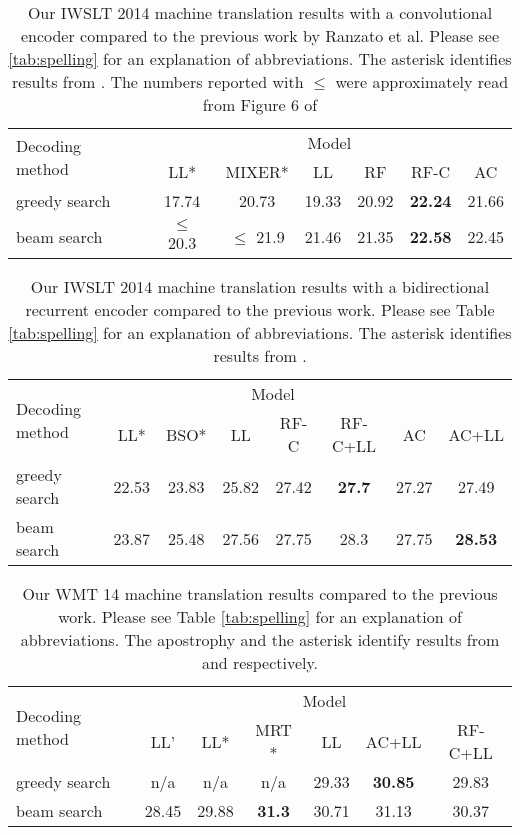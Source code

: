 \documentclass{article} \usepackage{iclr2017_conference,times}
\begin{document}
\begin{table}\centering
    \caption{Our IWSLT 2014 machine translation results with a convolutional encoder compared to the previous work by Ranzato et al.
    Please see \ref{tab:spelling} for an explanation of abbreviations. The asterisk
    identifies results from \citep{ranzato2015sequence}. 
    The numbers reported with $\leq$ were approximately read from
    Figure 6 of \citep{ranzato2015sequence} }
    \begin{tabular}{l | c | c | c | c | c | c}
        \multirow{2}{*}{Decoding method} & \multicolumn{6}{|c}{Model} \\
                                         & LL* & MIXER* & LL & RF & RF-C & AC \\
        \hline\hline
        greedy search & 17.74       & 20.73       & 19.33 & 20.92 & \textbf{22.24} & 21.66 \\
        beam search   & $\leq$ 20.3 & $\leq$ 21.9 & 21.46 & 21.35 & \textbf{22.58} & 22.45 
    \end{tabular}
    \label{tab:mt}
\end{table}

\begin{table}\centering
    \caption{
        Our IWSLT 2014 machine translation results with a bidirectional recurrent encoder compared to the previous work.
        Please see Table \ref{tab:spelling} for an explanation of abbreviations. The asterisk
        identifies results from \citep{wiseman2016sequence}. 
    }
    \begin{tabular}{l | c | c | c | c | c | c | c}
        \multirow{2}{*}{Decoding method} & \multicolumn{6}{|c}{Model} \\
                                         & LL* & BSO* & LL & RF-C & RF-C+LL & AC & AC+LL \\
        \hline\hline
        greedy search & 22.53 & 23.83 & 25.82 & 27.42 & \textbf{27.7} & 27.27 & 27.49\\
        beam search   & 23.87 & 25.48 & 27.56 & 27.75 & 28.3 & 27.75 & \textbf{28.53}
    \end{tabular}
    \label{tab:mt2}
\end{table}

\begin{table}\centering
    \caption{
        Our WMT 14 machine translation results compared to the previous work.
        Please see Table \ref{tab:spelling} for an explanation of
        abbreviations. The apostrophy and the asterisk identify results from
        \citep{bahdanau2015neural} and \citep{shen2015minimum} respectively.
    }
    \begin{tabular}{l | c | c | c | c | c | c}
        \multirow{2}{*}{Decoding method} & \multicolumn{6}{|c}{Model} \\
                                         & LL' & LL* & MRT * & LL & AC+LL & RF-C+LL \\
        \hline\hline
        greedy search & n/a & n/a & n/a & 29.33 & \textbf{30.85} & 29.83\\
        beam search   & 28.45 & 29.88 & \textbf{31.3} & 30.71 & 31.13 & 30.37
    \end{tabular}
    \label{tab:wmt}
\end{table}
\end{document}
